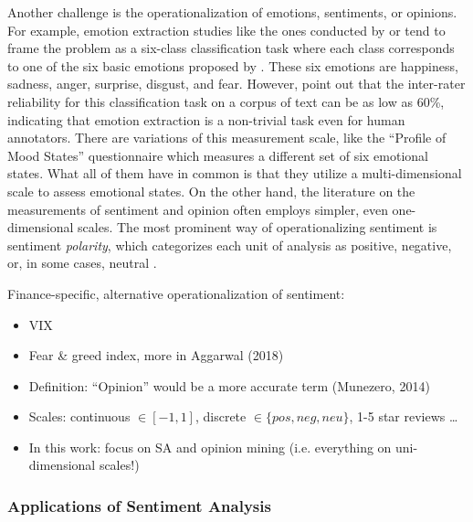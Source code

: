 Another challenge is the operationalization of emotions, sentiments, or opinions. For example, emotion extraction studies like the ones conducted by  or  tend to frame the problem as a six-class classification task where each class corresponds to one of the six basic emotions proposed by . These six emotions are happiness, sadness, anger, surprise, disgust, and fear. However,  point out that the inter-rater reliability for this classification task on a corpus of text can be as low as 60\%, indicating that emotion extraction is a non-trivial task even for human annotators. There are variations of this measurement scale, like the ``Profile of Mood States'' questionnaire  which measures a different set of six emotional states. What all of them have in common is that they utilize a multi-dimensional scale to assess emotional states. \newline
On the other hand, the literature on the measurements of sentiment and opinion often employs simpler, even one-dimensional scales. The most prominent way of operationalizing sentiment is sentiment \emph{polarity}, which categorizes each unit of analysis as positive, negative, or, in some cases, neutral \cite{ravi2015survey}.

Finance-specific, alternative operationalization of sentiment:
\begin{itemize}[noitemsep]
	\item VIX
	\item Fear \& greed index, more in Aggarwal (2018)
\end{itemize}


\begin{itemize}[noitemsep]
	\item Definition: ``Opinion'' would be a more accurate term (Munezero, 2014)
	\item Scales: continuous $\in [-1, 1]$, discrete $\in \{pos, neg, neu\}$, 1-5 star reviews \dots
	\item In this work: focus on SA and opinion mining (i.e. everything on uni-dimensional scales!)
\end{itemize}


\newpage %




\subsubsection{Applications of Sentiment Analysis}

